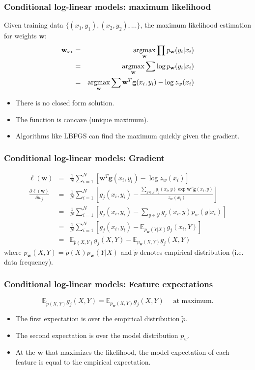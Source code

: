 \documentclass[ignorenonframetext,plain]{beamer}
\DeclareMathOperator*{\argmax}{argmax}
\renewcommand{\vec}{\mathbf}
\begin{document}
\begin{frame}\frametitle{Conditional log-linear models: maximum
    likelihood}
Given training data $\{(x_1, y_1), (x_2, y_2), \dots \}$, the
maximum likelihood estimation for weights $\vec{w}$: \begin{eqnarray*}
\vec{w}_\textsc{ml} &=& \argmax_\vec{w} \prod p_\vec{w}(y_i | x_i) \\
&=& \argmax_\vec{w} \sum \log p_\vec{w}(y_i | x_i) \\
&=& \argmax_\vec{w} \sum \vec{w}^T \vec{g}(x_i, y_i) - \log z_w(x_i)
\end{eqnarray*}
\begin{itemize}
\item There is no closed form solution.
\item The function is concave (unique maximum).
\item Algorithms like LBFGS can find the maximum quickly given the
  gradient.
\end{itemize}
\end{frame}

\begin{frame}\frametitle{Conditional log-linear models: Gradient}
\begin{eqnarray*}
\ell(\vec{w}) &=& \frac{1}{N} \sum_{i=1}^N \left[ \vec{w}^T
    \vec{g}(x_i, y_i) - \log z_w(x_i) \right] \\
\frac{\partial \ell(\vec{w})}{\partial w_j} &=& \frac{1}{N}
  \sum_{i=1}^N \left[ g_j(x_i, y_i) - \frac{\sum_{y\in\mathcal{Y}}
      g_j(x_i, y) \exp \vec{w}^T \vec{g}(x_i, y)}{z_w(x_i)}
    \right] \\
&=& \frac{1}{N} \sum_{i=1}^N \left[ g_j(x_i, y_i) -
    \sum_{y\in\mathcal{Y}} g_j(x_i, y) p_w(y|x_i) \right] \\
&=& \frac{1}{N} \sum_{i=1}^N \left[ g_j(x_i, y_i) -
    \mathbb{E}_{p_\vec{w}(Y|X)} g_j(x_i ,Y) \right] \\
&=& \mathbb{E}_{\tilde{p}(X,Y)} g_j(X,Y) -
  \mathbb{E}_{p_\vec{w}(X,Y)} g_j(X,Y)
\end{eqnarray*}
where $p_\vec{w}(X,Y) = \tilde{p}(X)p_\vec{w}(Y|X)$ and
$\tilde{p}$ denotes empirical distribution (i.e. data frequency).
\end{frame}

\begin{frame}\frametitle{Conditional log-linear models: Feature expectations}
\[
\mathbb{E}_{\tilde{p}(X,Y)} g_j(X,Y) =
  \mathbb{E}_{p_\vec{w}(X,Y)} g_j(X,Y)\quad \mbox{ at maximum.}
\]
\begin{itemize}
\item The first expectation is over the empirical distribution
  $\tilde{p}$.
\item The second expectation is over the model distribution $p_w$.
\item At the $\vec{w}$ that maximizes the likelihood, the model
  expectation of each feature is equal to the empirical expectation.
\end{itemize}
\end{frame}
\end{document}
